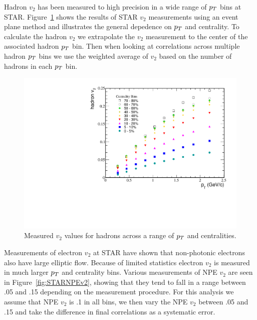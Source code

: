 Hadron $v_2$ has been measured to high precision in a wide range of $p_{T}$ bins at STAR. Figure~\ref{fig:STARHadv2} shows the results of STAR $v_2$ measurements using an event plane method and illustrates the general depedence on $p_{T}$ and centrality. To calculate the hadron $v_2$ we extrapolate the $v_2$ measurement to the center of the associated hadron $p_{T}$ bin. Then when looking at correlations across multiple hadron $p_{T}$ bins we use the weighted average of $v_2$ based on the number of hadrons in each $p_{T}$ bin.

\begin{figure}[htbp]
\begin{center}
\includegraphics[scale=.8]{Plots/Correlations/STAR_hadron_v2.pdf}
\end{center}
\caption[STAR measured hadron $v_2$]{Measured $v_2$ values for hadrons across a range of $p_{T}$ and centralities.}
\label{fig:STARHadv2}
\end{figure}

Measurements of electron $v_2$ at STAR have shown that non-photonic electrons also have large elliptic flow. Because of limited statistics electron $v_2$ is measured in much larger $p_{T}$ and centrality bins. Various measurements of NPE $v_2$ are seen in Figure~\ref{fig:STARNPEv2}, showing that they tend to fall in a range between .05 and .15 depending on the measurement procedure. For this analysis we assume that NPE $v_2$ is .1 in all bins, we then vary the NPE $v_2$ between .05 and .15 and take the difference in final correlations as a systematic error. 

